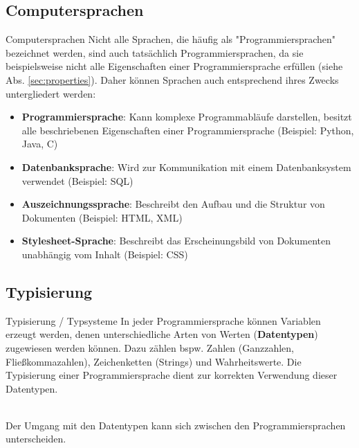         \subsection{Computersprachen}
            \begin{frame}{Computersprachen}
                Nicht alle Sprachen, die häufig als "Programmiersprachen" bezeichnet werden, sind auch tatsächlich Programmiersprachen, da sie beispielsweise nicht alle Eigenschaften einer Programmiersprache erfüllen (siehe Abs. \ref{sec:properties}). Daher können Sprachen auch entsprechend ihres Zwecks untergliedert werden:
                
                \begin{itemize}
                    \item \textbf{Programmiersprache}: Kann komplexe Programmabläufe darstellen, besitzt alle beschriebenen Eigenschaften einer Programmiersprache (Beispiel: Python, Java, C)
                    \item \textbf{Datenbanksprache}: Wird zur Kommunikation mit einem Datenbanksystem verwendet (Beispiel: SQL)
                    \item \textbf{Auszeichnungssprache}: Beschreibt den Aufbau und die Struktur von Dokumenten (Beispiel: HTML, XML)
                    \item \textbf{Stylesheet-Sprache}: Beschreibt das Erscheinungsbild von Dokumenten unabhängig vom Inhalt (Beispiel: CSS)
                \end{itemize}
                
            
            \end{frame}

        \subsection{Typisierung}
            \begin{frame}{Typisierung / Typsysteme}
                In jeder Programmiersprache können Variablen erzeugt werden, denen unterschiedliche Arten von Werten (\textbf{Datentypen}) zugewiesen werden können. Dazu zählen bspw. Zahlen (Ganzzahlen, Fließkommazahlen), Zeichenketten (Strings) und Wahrheitswerte. Die Typisierung einer Programmiersprache dient zur korrekten Verwendung dieser Datentypen. \\~\
                
                Der Umgang mit den Datentypen kann sich zwischen den Programmiersprachen unterscheiden.
                
            \end{frame}
            
